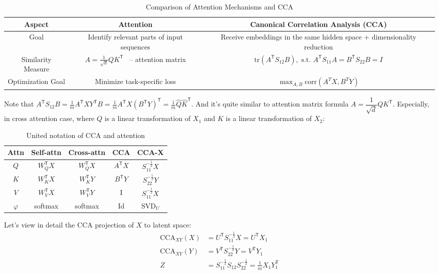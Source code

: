 \documentclass[a4paper,14pt]{article}
\newcommand{\T}{^{\mathsf{T}}}
\theoremstyle{plain} %
\theoremstyle{definition} %
\theoremstyle{remark} %
\begin{document}
	\begin{table}[bhtp]
		\centering
		\begin{tabulary}{\textwidth}{|C|C|C|}
			\hline
			\textbf{Aspect} & \textbf{Attention} & \textbf{Canonical Correlation Analysis (CCA)} \\ 
			\hline
			Goal & Identify relevant parts of input sequences & Receive embeddings in the same hidden space + dimensionality reduction \\
			\hline
			Similarity Measure & $A = \frac{1}{\sqrt{d}} Q K\T$ ~-- attention matrix & $\text{tr}(A\T S_{12} B), \text{ s.t. } A\T S_{11} A = B\T S_{22} B = I$ \\
			\hline
			Optimization Goal & Minimize task-specific loss & $\max_{A,B} \text{corr}(A^T X, B^T Y)$ \\
			\hline
		\end{tabulary}
		\caption{Comparison of Attention Mechanisms and CCA}
	\end{table}
	
	Note that $A\T S_{12} B = \frac{1}{m} A\T X Y\T B = \frac{1}{m} A\T X \left( B\T Y \right)\T = \frac{1}{m} \widehat{Q} \widehat{K}\T $. And it's quite similar to attention matrix formula $A = \dfrac{1}{\sqrt{d}} Q K\T$. Especially, in cross attention case, where $Q$ is a linear transformation of $X_1$ and $K$ is a linear transformation of $X_2$:
	
	\begin{table}[bhtp]
		\centering
		\begin{tabulary}{\textwidth}{|C|C|C|C|C|}
			\hline
			\textbf{Attn} & \textbf{Self-attn} & \textbf{Cross-attn} & \textbf{CCA} & \textbf{CCA-X} \\
			\hline
			$Q$                & $W_Q\T X$                 & $W_Q\T X$                  & $A\T X$ & $S_{11}^{-\frac{1}{2}}X$    \\
			\hline
			$K$                & $W_K\T X$                 & $W_K\T Y$                  & $B\T Y$ & $S_{22}^{-\frac{1}{2}}Y$     \\
			\hline
			$V$                & $W_V\T X$                 & $W_V\T Y$                  & I & $S_{11}^{-\frac{1}{2}}X$   \\
			\hline 
			$\varphi$ & softmax & softmax & Id & $\text{SVD}_U$ \\
			\hline  
		\end{tabulary}
		\caption{United notation of CCA and attention}
	\end{table}

	Let's view in detail the CCA projection of $X$ to latent space:
	\begin{equation}
		\begin{aligned}
			\text{CCA}_{XY}(X) &= U\T S_{11}^{-\frac{1}{2}}X = U\T X_1 \\
			\text{CCA}_{XY}(Y) &= V\T S_{22}^{-\frac{1}{2}}Y = V\T Y_1 \\
			Z &= S_{11}^{- \frac{1}{2}} S_{12} S_{22}^{- \frac{1}{2}} = \frac{1}{m} X_1 Y_1\T
		\end{aligned}
	\end{equation}
\end{document}
